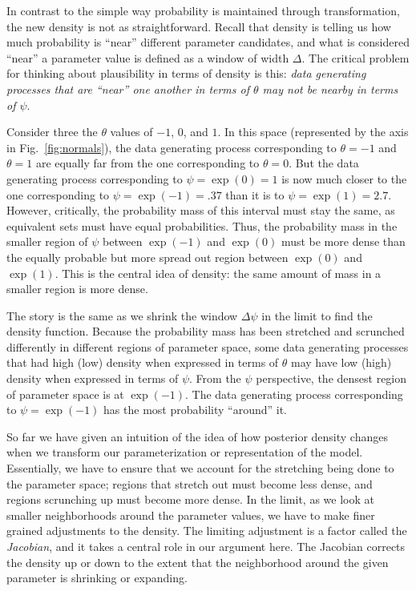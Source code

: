 \documentclass[9pt,twocolumn,twoside]{cidlab-draft}\templatetype{cidlab-invited}
\begin{document}
In contrast to the simple way probability is maintained through transformation, the new density is not as straightforward.  Recall that density is telling us how much probability is ``near'' different parameter candidates, and what is considered ``near'' a parameter value is defined as a window of width $\Delta$.  The critical problem for thinking about plausibility in terms of density is this: \textit{data generating processes that are ``near'' one another in terms of $\theta$ may not be nearby in terms of $\psi$}. 

Consider three the $\theta$ values of $-1$, $0$, and $1$. In this space (represented by the axis in Fig.~\ref{fig:normals}), the data generating process corresponding to $\theta=-1$ and $\theta=1$ are equally far from the one corresponding to $\theta=0$.  But the data generating process corresponding to $\psi=\exp{(0)}=1$ is now much closer to the one corresponding to $\psi=\exp{(-1)} = .37$ than it is to $\psi=\exp{(1)}= 2.7$.  However, critically, the probability mass of this interval must stay the same, as equivalent sets must have equal probabilities. Thus, the probability mass in the smaller region of $\psi$ between $\exp{(-1)}$ and $\exp{(0)}$ must be more dense than the equally probable but more spread out region between $\exp{(0)}$ and $\exp{(1)}$. This is the central idea of density: the same amount of mass in a smaller region is more dense. 

The story is the same as we shrink the window $\Delta\psi$ in the limit to find the density function. Because the probability mass has been stretched and scrunched differently in different regions of parameter space, some data generating processes that had high (low) density when expressed in terms of $\theta$ may have low (high) density when expressed in terms of $\psi$.  From the $\psi$ perspective, the densest region of parameter space is at $\exp{(-1)}$. The data generating process corresponding to $\psi=\exp{(-1)}$ has the most probability ``around'' it. 

So far we have given an intuition of the idea of how posterior density changes when we transform our parameterization or representation of the model. Essentially, we have to ensure that we account for the stretching being done to the parameter space; regions that stretch out must become less dense, and regions scrunching up must become more dense.  In the limit, as we look at smaller neighborhoods around the parameter values, we have to make finer grained adjustments to the density. The limiting adjustment is a factor called the \textit{Jacobian}, and it takes a central role in our argument here.  The Jacobian corrects the density up or down to the extent that the neighborhood around the given parameter is shrinking or expanding. 
\end{document}
